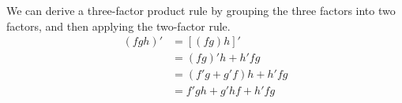 We can derive a three-factor product rule by grouping the
three factors into two factors, and then applying the
two-factor rule.
\begin{align*}
  (fgh)' &= [(fg)h]' \\
         &= (fg)'h+h'fg \\
         &= (f'g+g'f)h+h'fg \\
         &= f'gh+g'hf+h'fg
\end{align*}
